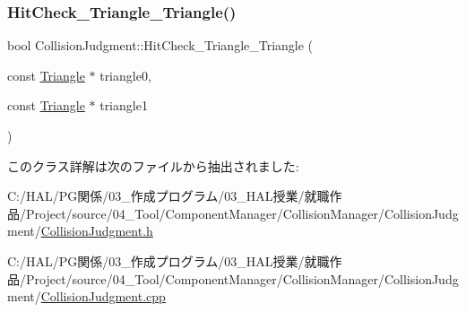 \mbox{\label{class_collision_judgment_ab33b8936e62bdb9b6cf6f3d383c033b9}} 
\subsubsection{\texorpdfstring{Hit\+Check\+\_\+\+Triangle\+\_\+\+Triangle()}{HitCheck\_Triangle\_Triangle()}}
{\footnotesize\ttfamily bool Collision\+Judgment\+::\+Hit\+Check\+\_\+\+Triangle\+\_\+\+Triangle (\begin{DoxyParamCaption}\item[{const \mbox{\hyperlink{class_triangle}{Triangle}} $\ast$}]{triangle0,  }\item[{const \mbox{\hyperlink{class_triangle}{Triangle}} $\ast$}]{triangle1 }\end{DoxyParamCaption})\hspace{0.3cm}{\ttfamily [static]}}



このクラス詳解は次のファイルから抽出されました\+:\begin{DoxyCompactItemize}
\item 
C\+:/\+H\+A\+L/\+P\+G関係/03\+\_\+作成プログラム/03\+\_\+\+H\+A\+L授業/就職作品/\+Project/source/04\+\_\+\+Tool/\+Component\+Manager/\+Collision\+Manager/\+Collision\+Judgment/\mbox{\hyperlink{_collision_judgment_8h}{Collision\+Judgment.\+h}}\item 
C\+:/\+H\+A\+L/\+P\+G関係/03\+\_\+作成プログラム/03\+\_\+\+H\+A\+L授業/就職作品/\+Project/source/04\+\_\+\+Tool/\+Component\+Manager/\+Collision\+Manager/\+Collision\+Judgment/\mbox{\hyperlink{_collision_judgment_8cpp}{Collision\+Judgment.\+cpp}}\end{DoxyCompactItemize}
